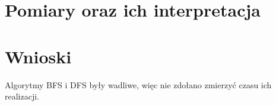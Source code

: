 \documentclass[11pt,a4paper]{article}
\begin{document}
\section{Pomiary oraz ich interpretacja}





\section{Wnioski}
\hspace{4ex} Algorytmy BFS i DFS były wadliwe, więc nie zdołano zmierzyć czasu ich realizacji.
\end{document}

